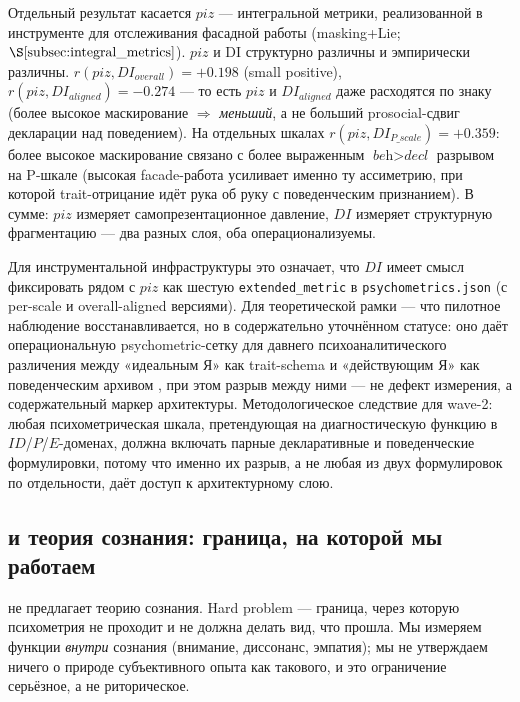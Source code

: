Отдельный результат касается $piz$ --- интегральной метрики, реализованной в инструменте для отслеживания фасадной работы (masking+Lie; $\S\ref{subsec:integral_metrics}$). $piz$ и DI структурно различны и эмпирически различны. $r(piz, DI_{overall}){=}{+}0.198$ (small positive), $r(piz, DI_{aligned}){=}{-}0.274$ --- то есть $piz$ и $DI_{aligned}$ даже расходятся по знаку (более высокое маскирование $\Rightarrow$ \emph{меньший}, а не больший prosocial-сдвиг декларации над поведением). На отдельных шкалах $r(piz, DI_{P\_scale}){=}{+}0.359$: более высокое маскирование связано с более выраженным $\textit{beh}>\textit{decl}$ разрывом на P-шкале (высокая facade-работа усиливает именно ту ассиметрию, при которой trait-отрицание идёт рука об руку с поведенческим признанием). В сумме: $piz$ измеряет самопрезентационное давление, $DI$ измеряет структурную фрагментацию --- два разных слоя, оба операционализуемы.

Для инструментальной инфраструктуры это означает, что $DI$ имеет смысл фиксировать рядом с $piz$ как шестую \texttt{extended\_metric} в \texttt{psychometrics.json} (с per-scale и overall-aligned версиями). Для теоретической рамки --- что пилотное наблюдение восстанавливается, но в содержательно уточнённом статусе: оно даёт операциональную psychometric-сетку для давнего психоаналитического различения между «идеальным Я» как trait-schema и «действующим Я» как поведенческим архивом \citep{freud1917, winnicott1965}, при этом разрыв между ними --- не дефект измерения, а содержательный маркер архитектуры. Методологическое следствие для wave-2: любая психометрическая шкала, претендующая на диагностическую функцию в $ID$/$P$/$E$-доменах, должна включать парные декларативные и поведенческие формулировки, потому что именно их разрыв, а не любая из двух формулировок по отдельности, даёт доступ к архитектурному слою.

\subsection{\DEIC{} и теория сознания: граница, на которой мы работаем}
\label{subsec:consciousness}

\DEIC{} не предлагает теорию сознания. Hard problem \citep{chalmers1995} --- граница, через которую психометрия не проходит и не должна делать вид, что прошла. Мы измеряем функции \emph{внутри} сознания (внимание, диссонанс, эмпатия); мы не утверждаем ничего о природе субъективного опыта как такового, и это ограничение серьёзное, а не риторическое.

